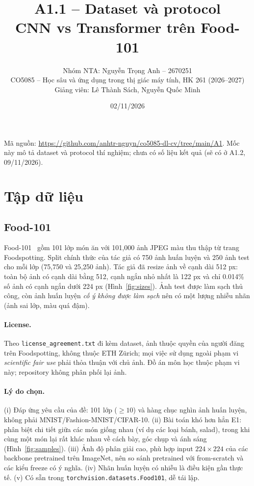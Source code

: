 \documentclass[11pt,a4paper]{article}
\title{\textbf{A1.1 -- Dataset và protocol}\\[2pt]
\large CNN vs Transformer trên Food-101}
\author{Nhóm NTA: Nguyễn Trọng Anh -- 2670251\\
CO5085 -- Học sâu và ứng dụng trong thị giác máy tính, HK 261 (2026--2027)\\
Giảng viên: Lê Thành Sách, Nguyễn Quốc Minh}
\date{02/11/2026}
\begin{document}
\maketitle

\noindent Mã nguồn: \url{https://github.com/anhtr-nguyn/co5085-dl-cv/tree/main/A1}.
Mốc này mô tả dataset và protocol thí nghiệm; chưa có số liệu kết quả (sẽ có ở A1.2, 09/11/2026).

\section{Tập dữ liệu}

\subsection{Food-101}
Food-101~\cite{bossard2014} gồm 101 lớp món ăn với 101{,}000 ảnh JPEG màu thu thập từ trang Foodspotting. Split chính thức của tác giả có 750 ảnh huấn luyện và 250 ảnh test cho mỗi lớp (75{,}750 và 25{,}250 ảnh). Tác giả đã resize ảnh về cạnh dài 512 px: toàn bộ ảnh có cạnh dài bằng 512, cạnh ngắn nhỏ nhất là 122 px và chỉ 0.014\% số ảnh có cạnh ngắn dưới 224 px (Hình~\ref{fig:sizes}). Ảnh test được làm sạch thủ công, còn ảnh huấn luyện \emph{cố ý không được làm sạch} nên có một lượng nhiễu nhãn (ảnh sai lớp, màu quá đậm).

\paragraph{License.} Theo \texttt{license\_agreement.txt} đi kèm dataset, ảnh thuộc quyền của người đăng trên Foodspotting, không thuộc ETH Zürich; mọi việc sử dụng ngoài phạm vi \emph{scientific fair use} phải thỏa thuận với chủ ảnh. Đồ án môn học thuộc phạm vi này; repository không phân phối lại ảnh.

\paragraph{Lý do chọn.}
(i) Đáp ứng yêu cầu của đề: 101 lớp ($\geq 10$) và hàng chục nghìn ảnh huấn luyện, không phải MNIST/Fashion-MNIST/CIFAR-10.
(ii) Bài toán khó hơn hẳn E1: phân biệt chi tiết giữa các món giống nhau (ví dụ các loại bánh, salad), trong khi cùng một món lại rất khác nhau về cách bày, góc chụp và ánh sáng (Hình~\ref{fig:samples}).
(iii) Ảnh độ phân giải cao, phù hợp input $224\times224$ của các backbone pretrained trên ImageNet, nên so sánh pretrained với from-scratch và các kiểu freeze có ý nghĩa.
(iv) Nhãn huấn luyện có nhiễu là điều kiện gần thực tế.
(v) Có sẵn trong \texttt{torchvision.datasets.Food101}, dễ tái lập.
\end{document}

